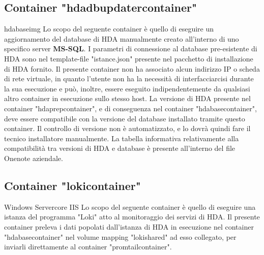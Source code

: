 \subsection{Container "hdadbupdatercontainer"}
\begin{namespacedesc}
	 {hdabaseimg}
	 {Lo scopo del seguente container è quello di eseguire un aggiornamento del database di HDA manualmente creato all'interno di uno specifico server \textbf{MS-SQL}. I parametri di connessione al database pre-esistente di HDA sono nel template-file "istance.json" presente nel pacchetto di installazione di HDA fornito.
Il presente container non ha associato alcun indirizzo IP o scheda di rete virtuale, in quanto l'utente non ha la necessità di interfacciarcisi durante la sua esecuzione e può, inoltre, essere eseguito indipendentemente da qualsiasi altro container in esecuzione sullo stesso host.
La versione di HDA presente nel container "hdaprepcontainer", e di conseguenza nel container "hdabasecontainer", deve essere compatibile con la versione del database installato tramite questo container. Il controllo di versione non è automatizzato, e lo dovrà quindi fare il tecnico installatore manualmente. La tabella informativa relativamente alla compatibilità tra versioni di HDA e database è presente all'interno del file Onenote aziendale.  
}
\end{namespacedesc}

\subsection{Container "lokicontainer"}
\begin{namespacedesc}
	 {Windows Servercore IIS}
	 {Lo scopo del seguente container è quello di eseguire una istanza del programma "Loki" atto al monitoraggio dei servizi di HDA. Il presente container preleva i dati popolati dall'istanza di HDA in esecuzione nel container "hdabasecontainer" nel volume mapping "lokishared"  ad esso collegato, per inviarli direttamente al container "promtailcontainer".}
\end{namespacedesc}

